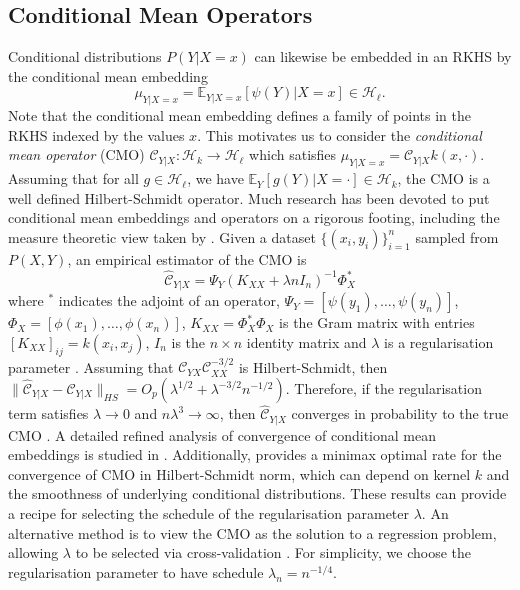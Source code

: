 \documentclass[twocolumn]{article}
\theoremstyle{definition}
\begin{document}
\subsection{Conditional Mean Operators}

Conditional distributions $P(Y|X=x)$ can likewise be embedded in an RKHS by the conditional mean embedding \citep{Song_2009}
\begin{equation*}
    \mu_{Y|X=x} = \mathbb{E}_{Y|X = x} [\psi(Y) | X=x] \in \mathcal{H}_\ell.
\end{equation*}
Note that the conditional mean embedding defines a family of points in the RKHS indexed by the values $x$. This motivates us to consider the \emph{conditional mean operator} (CMO) $\mathcal{C}_{Y|X}:\mathcal H_{k}\to\mathcal H_{\ell}$ which satisfies $\mu_{Y|X=x} = \mathcal{C}_{Y|X}k(x, \cdot)$. Assuming that for all $g \in \mathcal H_{\ell}$, we have $\mathbb{E}_Y[g(Y) | X = \cdot] \in \mathcal H_k$, the CMO is a well defined Hilbert-Schmidt operator.
Much research has been devoted to put conditional mean embeddings and operators on a rigorous footing, including the measure theoretic view taken by \citet{Park_2020}. Given a dataset $\{(x_i, y_i)\}_{i=1}^n$ sampled from $P(X,Y)$, an empirical estimator of the CMO is 
\begin{equation} \label{eq:cmo_est}
    \widehat{\mathcal{C}}_{Y|X} = \Psi_Y (K_{XX} + \lambda n I_n)^{-1} \Phi_X^*
\end{equation}
where $^*$ indicates the adjoint of an operator, $\Psi_Y = [\psi (y_1), \dots, \psi (y_n)]$, $\Phi_X = [\phi(x_1), \dots, \phi(x_n)]$, $K_{XX} = \Phi_X^* \Phi_X$ is the Gram matrix with entries $[K_{XX}]_{ij} = k(x_i, x_j)$, $I_n$ is the $n\times n$ identity matrix and $\lambda$ is a regularisation parameter \citep{Song_2009}. Assuming that $\mathcal{C}_{YX} \mathcal{C}_{XX}^{-3/2}$ is Hilbert-Schmidt, then $\| \widehat{\mathcal{C}}_{Y|X} - \mathcal{C}_{Y|X} \|_{HS} = O_p(\lambda^{1/2}+\lambda^{-3/2}n^{-1/2})$. Therefore, if the regularisation term satisfies $\lambda \to 0$ and $n \lambda^3 \to \infty$, then $\widehat{\mathcal{C}}_{Y|X}$ converges in probability to the true CMO \citep[Theorem 1]{Song_2010}. A detailed refined analysis of convergence of conditional mean embeddings is studied in \cite{Li_2022}. Additionally, \citep[Supplementary Material, Section 8]{singh_2023} provides a minimax optimal rate for the convergence of CMO in Hilbert-Schmidt norm, which can depend on kernel $k$ and the smoothness of underlying conditional distributions. These results can provide a recipe for selecting the schedule of the regularisation parameter $\lambda$. An alternative method is to view the CMO as the solution to a regression problem, allowing $\lambda$ to be selected via cross-validation \citep{Grunewalder_2012}. For simplicity, we choose the regularisation parameter to have schedule $\lambda_n = n^{-1/4}$.
\end{document}
